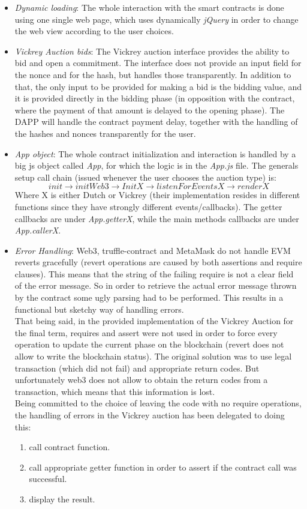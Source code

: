 \documentclass[11pt, a4paper]{report}
\begin{document}
\begin{itemize}
\begin{figure}
		\label{fig:UI}
	\end{figure}
	\item \emph{Dynamic loading}: The whole interaction with the smart contracts is done using one single web page, which uses dynamically \emph{jQuery} in order to change the web view according to the user choices.
	\item \emph{Vickrey Auction bids}: The Vickrey auction interface provides the ability to bid and open a commitment. The interface does not provide an input field for the nonce and for the hash, but handles those transparently. In addition to that, the only input to be provided for making a bid is the bidding value, and it is provided directly in the bidding phase (in opposition with the contract, where the payment of that amount is delayed to the opening phase). The DAPP will handle the contract payment delay, together with the handling of the hashes and nonces transparently for the user.
	\item \emph{App object}: The whole contract initialization and interaction is handled by a big js object called \emph{App}, for which the logic is in the \emph{App.js} file. The generals setup call chain (issued whenever the user chooses the auction type) is: 
	$$ init \rightarrow initWeb3 \rightarrow InitX \rightarrow listenForEventsX \rightarrow renderX $$
	Where X is either Dutch or Vickrey (their implementation resides in different functions since they have strongly different events/callbacks).
	The getter callbacks are under \emph{App.getterX}, while the main methods callbacks are under \emph{App.callerX}.
	\item \emph{Error Handling}: Web3, truffle-contract and MetaMask do not handle EVM reverts gracefully (revert operations are caused by both assertions and require clauses). This means that the string of the failing require is not a clear field of the error message. So in order to retrieve the actual error message thrown by the contract some ugly parsing had to be performed. This results in a functional but sketchy way of handling errors.\\ That being said, in the provided implementation of the Vickrey Auction for the final term, requires and assert were not used in order to force every operation to update the current phase on the blockchain (revert does not allow to write the blockchain status). The original solution was to use legal transaction (which did not fail) and appropriate return codes. But unfortunately web3 does not allow to obtain the return codes from a transaction, which means that this information is lost. \\Being committed to the choice of leaving the code with no require operations, the handling of errors in the Vickrey auction has been delegated to doing this:
	\begin{enumerate}
		\item call contract function.
		\item call appropriate getter function in order to assert if the contract call was successful.
		\item display the result.
	\end{enumerate}
\end{itemize}
\end{document}
